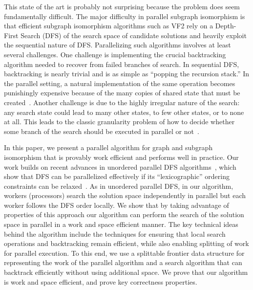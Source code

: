 This state of the art is probably not surprising because the problem
does seem fundamentally difficult.
%
The major difficulty in parallel subgraph isomorphism is that
efficient subgraph isomorphism algorithms such as VF2 rely on a
Depth-First Search (DFS) of the search space of candidate solutions
and heavily exploit the sequential nature of DFS.
%
Parallelizing such algorithms involves at least several challenges.
%
One challenge is implementing the crucial backtracking algorithm
needed to recover from failed branches of search.
%
In sequential DFS, backtracking is nearly trivial and is as simple as
``popping the recursion stack.''
%
In the parallel setting, a natural implementation of the same operation
becomes punishingly expensive because of the many copies of shared
state that must be created~\cite{blankstein}.
%
Another challenge is due to the highly irregular nature of the search:
any search state could lead to many other
states, to few other states, or to none at all.
%
This leads to the classic granularity problem of how to decide whether
some branch of the search should be executed in parallel or
not~\cite{subgraphdatabase}.

In this paper, we present a parallel algorithm for graph and subgraph
isomorphism that is provably work efficient and performs well in
practice.
%
Our work builds on recent advances in unordered parallel DFS
algorithms~\cite{pdfs-15}, which show that DFS can be parallelized
effectively if its ``lexicographic'' ordering constraints can be
relaxed~\cite{Reif85}.
%
As in unordered parallel DFS, in our algorithm, workers (processors)
search the solution space independently in parallel but each worker
follows the DFS order locally.
%
We show that by taking advantage of properties of this approach our
algorithm can perform the search of the solution space in parallel in
a work and space efficient manner.
%
The key technical ideas behind the algorithm include the techniques
for ensuring that local search operations and backtracking remain
efficient, while also enabling splitting of work for parallel
execution.
%
To this end, we use a splittable frontier data structure for
representing the work of the parallel algorithm and a search algorithm
that can backtrack efficiently without using additional space.
%
We prove that our algorithm is work and space efficient,
and prove key correctness properties.


